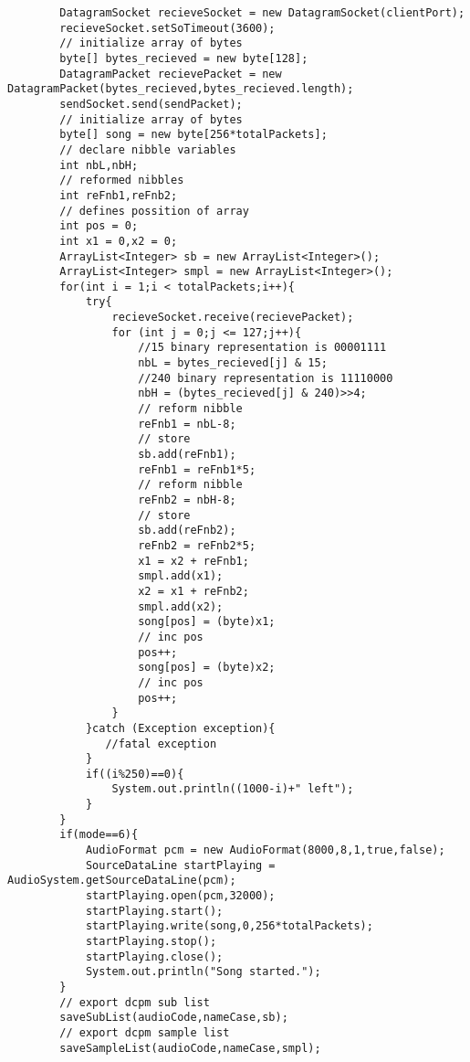 \documentclass{article}
\begin{document}
\begin{lstlisting}
        DatagramSocket recieveSocket = new DatagramSocket(clientPort);
        recieveSocket.setSoTimeout(3600);
        // initialize array of bytes
        byte[] bytes_recieved = new byte[128];
        DatagramPacket recievePacket = new DatagramPacket(bytes_recieved,bytes_recieved.length);
        sendSocket.send(sendPacket);
        // initialize array of bytes
        byte[] song = new byte[256*totalPackets];
        // declare nibble variables
        int nbL,nbH;
        // reformed nibbles
        int reFnb1,reFnb2;
        // defines possition of array
        int pos = 0;
        int x1 = 0,x2 = 0;
        ArrayList<Integer> sb = new ArrayList<Integer>();
        ArrayList<Integer> smpl = new ArrayList<Integer>();
        for(int i = 1;i < totalPackets;i++){
            try{
                recieveSocket.receive(recievePacket);
                for (int j = 0;j <= 127;j++){
                    //15 binary representation is 00001111
                    nbL = bytes_recieved[j] & 15;
                    //240 binary representation is 11110000
                    nbH = (bytes_recieved[j] & 240)>>4;
                    // reform nibble
                    reFnb1 = nbL-8;
                    // store
                    sb.add(reFnb1);
                    reFnb1 = reFnb1*5;
                    // reform nibble
                    reFnb2 = nbH-8;
                    // store
                    sb.add(reFnb2);
                    reFnb2 = reFnb2*5;
                    x1 = x2 + reFnb1;
                    smpl.add(x1);
                    x2 = x1 + reFnb2;
                    smpl.add(x2);
                    song[pos] = (byte)x1;
                    // inc pos
                    pos++;
                    song[pos] = (byte)x2;
                    // inc pos
                    pos++;
                }
            }catch (Exception exception){
               //fatal exception
            }
            if((i%250)==0){
                System.out.println((1000-i)+" left");
            }
        }
        if(mode==6){
            AudioFormat pcm = new AudioFormat(8000,8,1,true,false);
            SourceDataLine startPlaying = AudioSystem.getSourceDataLine(pcm);
            startPlaying.open(pcm,32000);
            startPlaying.start();
            startPlaying.write(song,0,256*totalPackets);
            startPlaying.stop();
            startPlaying.close();
            System.out.println("Song started.");
        }
        // export dcpm sub list
        saveSubList(audioCode,nameCase,sb);
        // export dcpm sample list
        saveSampleList(audioCode,nameCase,smpl);

\end{lstlisting}
\end{document}
